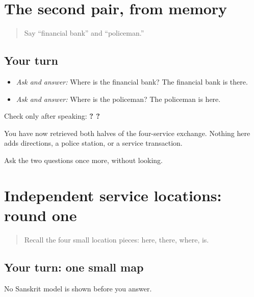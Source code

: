 \section[Practice]{The second pair, from memory}

\label{lesson:SA-C268-bank-police-location}



\begin{quote}
Say “financial bank” and “policeman.”
\end{quote}

\subsection*{Your turn}
\begin{itemize}
\raggedright
  \item \emph{Ask and answer:} Where is the financial bank? The financial bank is there.
  \item \emph{Ask and answer:} Where is the policeman? The policeman is here.
\end{itemize}

Check only after speaking: \textbf{  ?      ?   }

\begin{grammarlens}[title={What you've built}]
You have now retrieved both halves of the four-service exchange. Nothing here adds directions, a police station, or a service transaction.
\end{grammarlens}

\begin{tcolorbox}[breakable,colback=teal!4,colframe=teal!35!black,title={Before you move on}]
Ask the two questions once more, without looking.
\end{tcolorbox}
\section[(independent service locations, first …]{Independent service locations: round one}

\label{lesson:SA-C268-service-location-practice}



\begin{quote}
Recall the four small location pieces: here, there, where, is.
\end{quote}

\subsection*{Your turn: one small map}
No Sanskrit model is shown before you answer.

